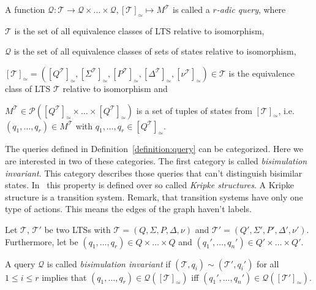 \begin{definition}
    \label{definition:query}
    A function $\mathcal{Q} : \mathscr{T} \rightarrow \mathscr{Q} \times \dots \times \mathscr{Q}, [\mathcal{T}]_\simeq
    \mapsto M^{\mathcal{T}}$ is called a
    \emph{$r$-adic query},
    where
    \begin{compactitem}
        \item $\mathscr{T}$ is the set of all equivalence classes of LTS relative to isomorphism,
        \item $\mathscr{Q}$ is the set of all equivalence classes of sets of states relative to isomorphism,
        \item $[\mathcal{T}]_\simeq = ([Q^\mathcal{T}]_\simeq, [\Sigma^\mathcal{T}]_\simeq, [P^\mathcal{T}]_\simeq,
        [\Delta^\mathcal{T}]_\simeq, [\nu^\mathcal{T}]_\simeq) \in \mathscr{T}$ is the equivalence class of LTS
        $\mathcal{T}$ relative to isomorphism and
        \item $M^{\mathcal{T}} \in \mathcal{P}([Q^\mathcal{T}]_\simeq \times \dots \times [Q^\mathcal{T}]_\simeq)$ is a
        set of tuples of states from $[\mathcal{T}]_\simeq$, i.e. $(q_1, \dots, q_r) \in M^{\mathcal{T}}$ with $q_1,
        \dots, q_r \in [Q^\mathcal{T}]_\simeq$.
    \end{compactitem}
\end{definition}

The queries defined in Definition~\ref{definition:query} can be categorized. Here we are interested in two of these
categories. The first category is called \textit{bisimulation invariant}. This category describes those queries that
can't distinguish bisimilar states. In~\cite{otto1999bisimulation} this property is defined over so called
\textit{Kripke structures}. A Kripke structure
is a transition system. Remark, that transition systems  have only one type of actions. This means the edges of the
graph haven't labels.

\begin{definition}
    \label{definition:bisimulationInvariant}
    Let $\mathcal{T}$, $\mathcal{T}'$ be two LTSs with $\mathcal{T} = (Q, \Sigma, P, \Delta, \nu)$
    and $\mathcal{T}' = (Q', \Sigma', P', \Delta', \nu')$. Furthermore, let be $(q_1, \dots, q_r) \in Q \times \dots
    \times Q$ and $({q_1}', \dots, {q_n}') \in Q' \times \dots \times Q'$.

    A query $\mathcal{Q}$ is called \emph{bisimulation invariant} if $(\mathcal{T}, q_i) \sim (\mathcal{T}', q_i')$
    for all $1 \leq i \leq r$ implies that $(q_1, \dots, q_r) \in \mathcal{Q}([\mathcal{T}]_\simeq)$ iff $({q_1}',
    \dots, {q_n}') \in \mathcal{Q}([\mathcal{T}']_\simeq)$.
\end{definition}

